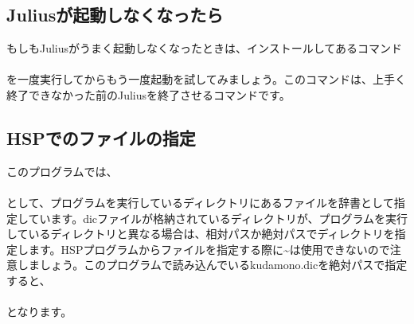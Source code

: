 \subsection{Juliusが起動しなくなったら}
もしもJuliusがうまく起動しなくなったときは、インストールしてあるコマンド\\
\\
を一度実行してからもう一度起動を試してみましょう。このコマンドは、上手く終了できなかった前のJuliusを終了させるコマンドです。

\subsection{HSPでのファイルの指定}
このプログラムでは、\\
\quad\\
として、プログラムを実行しているディレクトリにあるファイルを辞書として指定しています。dicファイルが格納されているディレクトリが、プログラムを実行しているディレクトリと異なる場合は、相対パスか絶対パスでディレクトリを指定します。HSPプログラムからファイルを指定する際に\textasciitilde は使用できないので注意しましょう。このプログラムで読み込んでいるkudamono.dicを絶対パスで指定すると、\\
\\
となります。


